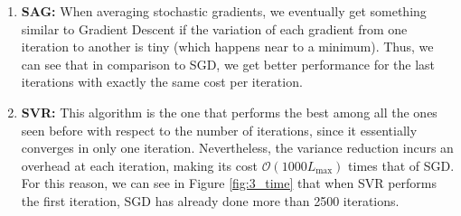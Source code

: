 \documentclass[letterpaper]{article}
\providecommand{\1}{\mathbf{1}}
\providecommand{\0}{\mathbf{0}}
\begin{document}
\begin{enumerate}[label=(\alph*)]
    \item \textbf{SAG: }When averaging stochastic gradients, we eventually get something similar to Gradient Descent if the variation of each gradient from one iteration to another is tiny (which happens near to a minimum). Thus, we can see that in comparison to SGD, we get better performance for the last iterations with exactly the same cost per iteration.
    
    \item \textbf{SVR: }This algorithm is the one that performs the best among all the ones seen before with respect to the number of iterations, since it essentially converges in only one iteration. Nevertheless, the variance reduction incurs an overhead at each iteration, making its cost $\mathcal{O}(1000L_{\max})$ times that of SGD. For this reason, we can see in Figure \ref{fig:3_time} that when SVR performs the first iteration, SGD has already done more than 2500 iterations.
    
\end{enumerate}
\end{document}
